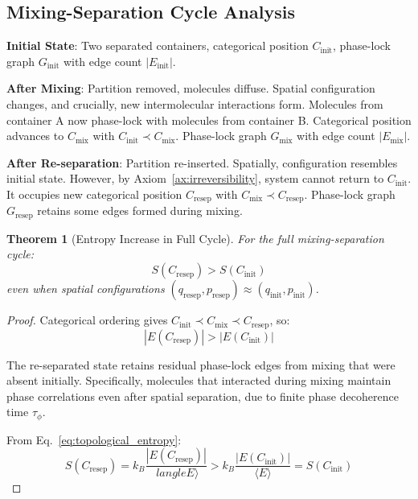 \documentclass[twocolumn,superscriptaddress,prb,10pt]{revtex4-2}
\newtheorem{theorem}{Theorem}
\theoremstyle{definition}
\theoremstyle{remark}
\begin{document}
\subsection{Mixing-Separation Cycle Analysis}

\textbf{Initial State}: Two separated containers, categorical position $C_{\text{init}}$, phase-lock graph $G_{\text{init}}$ with edge count $|E_{\text{init}}|$.

\textbf{After Mixing}: Partition removed, molecules diffuse. Spatial configuration changes, and crucially, new intermolecular interactions form. Molecules from container A now phase-lock with molecules from container B. Categorical position advances to $C_{\text{mix}}$ with $C_{\text{init}} \prec C_{\text{mix}}$. Phase-lock graph $G_{\text{mix}}$ with edge count $|E_{\text{mix}}|$.

\textbf{After Re-separation}: Partition re-inserted. Spatially, configuration resembles initial state. However, by Axiom~\ref{ax:irreversibility}, system cannot return to $C_{\text{init}}$. It occupies new categorical position $C_{\text{resep}}$ with $C_{\text{mix}} \prec C_{\text{resep}}$. Phase-lock graph $G_{\text{resep}}$ retains some edges formed during mixing.

\begin{theorem}[Entropy Increase in Full Cycle]
\label{thm:entropy_cycle}
For the full mixing-separation cycle:
\begin{equation}
S(C_{\text{resep}}) > S(C_{\text{init}})
\end{equation}
even when spatial configurations $(q_{\text{resep}}, p_{\text{resep}}) \approx (q_{\text{init}}, p_{\text{init}})$.
\end{theorem}

\begin{proof}
Categorical ordering gives $C_{\text{init}} \prec C_{\text{mix}} \prec C_{\text{resep}}$, so:
\begin{equation}
|E(C_{\text{resep}})| > |E(C_{\text{init}})|
\end{equation}

The re-separated state retains residual phase-lock edges from mixing that were absent initially. Specifically, molecules that interacted during mixing maintain phase correlations even after spatial separation, due to finite phase decoherence time $\tau_{\phi}$.

From Eq.~\eqref{eq:topological_entropy}:
\begin{equation}
S(C_{\text{resep}}) = k_B \frac{|E(C_{\text{resep}})|}{\ langle E \rangle} > k_B \frac{|E(C_{\text{init}})|}{\langle E \rangle} = S(C_{\text{init}})
\end{equation}
\end{proof}
\end{document}
